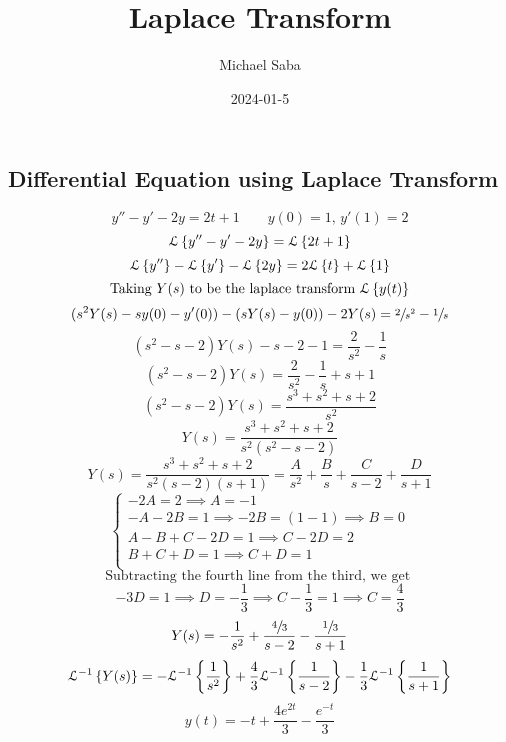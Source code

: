 \documentclass[12pt]{article}
\title{%
    \Huge Laplace Transform \\
}
\date{2024-01-5}
\author{Michael Saba}
\begin{document}
    \maketitle
    \newpage
    
    \subsection*{Differential Equation using Laplace Transform}
    \[
        y'' - y' - 2y  = 2t + 1 \qquad y(0) = 1, \, y'(1) = 2
    \]
    \[
        \mathcal{L}\left\{y'' - y' - 2y\right\} = \mathcal{L}\left\{2t+1\right\}
    \]
    \[
        \mathcal{L}\left\{y''\right\} - \mathcal{L}\left\{y'\right\} - \mathcal{L}\left\{2y\right\} 
        = 2\mathcal{L}\left\{t\right\} + \mathcal{L}\left\{1\right\}
    \]
    \[
        \text{Taking } Y(s)
        \text{ to be the laplace transform } \mathcal{L}\left\{y(t)\right\}
    \]
    \[
        (s^2Y(s) - sy(0) - y'(0))
        - (sY(s) - y(0)) - 2Y(s)
        = \sfrac{2}{s^2} - \sfrac{1}{s}
    \]
    \[
        (s^2-s-2)Y(s) - s - 2 - 1 = \dfrac{2}{s^2} - \dfrac{1}{s}
    \]
    \[
        (s^2-s-2)Y(s) = \dfrac{2}{s^2} - \dfrac{1}{s} + s + 1
    \]
    \[
        (s^2-s-2)Y(s) = \dfrac{s^3 + s^2 + s + 2}{s^2}
    \]
    \[
        Y(s) = \dfrac{s^3 + s^2 + s + 2}{s^2(s^2-s-2)}
    \]
    \[
        Y(s) = \dfrac{s^3 + s^2 + s + 2}{s^2(s-2)(s+1)}
        = \dfrac{A}{s^2} + \dfrac{B}{s} + \dfrac{C}{s-2} + \dfrac{D}{s+1}
    \]
    \[
        \begin{cases}
            -2A = 2 \implies A = -1 \\
            -A - 2B = 1 \implies -2B = (1-1) \implies B = 0 \\
            A - B + C -2D = 1 \implies C - 2D = 2 \\
            B + C + D = 1 \implies C + D = 1 \\
        \end{cases}
    \]
    \[ \text{Subtracting the fourth line from the third, we get } \]
    \[
        -3D = 1 \implies D = -\dfrac{1}{3}
        \implies C - \dfrac{1}{3} = 1 \implies C = \dfrac{4}{3}
    \]
    \[
        Y(s) = -\dfrac{1}{s^2} + \dfrac{\sfrac{4}{3}}{s-2}
        - \dfrac{\sfrac{1}{3}}{s+1}
    \]
    \[
        \mathcal{L}^{-1}\left\{Y(s)\right\} = -\mathcal{L}^{-1}\left\{\dfrac{1}{s^2}\right\} 
        + \dfrac{4}{3}\mathcal{L}^{-1}\left\{\dfrac{1}{s-2}\right\}
        - \dfrac{1}{3}\mathcal{L}^{-1}\left\{\dfrac{1}{s+1}\right\}
    \]
    \[
        y(t) = -t + \dfrac{4e^{2t}}{3} - \dfrac{e^{-t}}{3}
    \]

    \newpage
\end{document}

